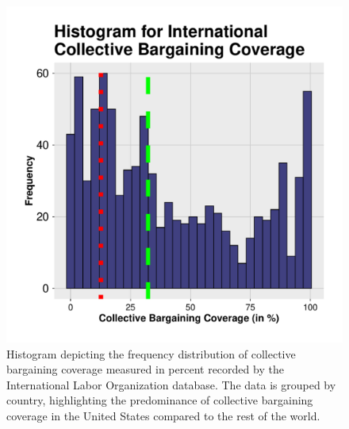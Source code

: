 \documentclass[11pt]{article}\usepackage[]{graphicx}\usepackage[]{xcolor}
\newenvironment{knitrout}{}{} %
\begin{document}
\begin{figure}[h]
\centering
\begin{minipage}{0.7\linewidth}
\begin{knitrout}
\color{fgcolor}

{\centering \includegraphics[width=0.7\linewidth]{figure/CollectiveBargaining-1} 

}


\end{knitrout}
  \caption[Collective Bargaining Coverage]{Histogram depicting the frequency distribution of collective bargaining coverage measured in percent recorded by the International Labor Organization database. The data is grouped by country, highlighting the predominance of collective bargaining coverage in the United States compared to the rest of the world.}
  \label{fig:5}
  \end{minipage}
\end{figure}
\hspace{5pt}
\end{document}
